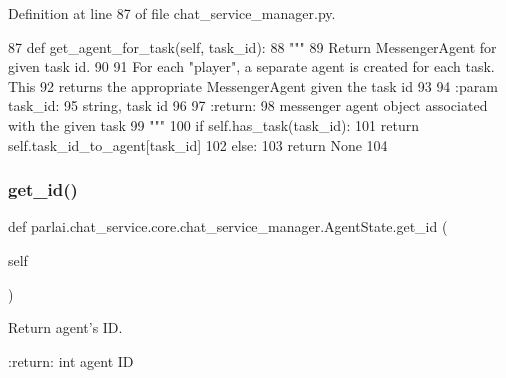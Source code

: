Definition at line 87 of file chat\+\_\+service\+\_\+manager.\+py.


\begin{DoxyCode}
87     \textcolor{keyword}{def }get\_agent\_for\_task(self, task\_id):
88         \textcolor{stringliteral}{"""}
89 \textcolor{stringliteral}{        Return MessengerAgent for given task id.}
90 \textcolor{stringliteral}{}
91 \textcolor{stringliteral}{        For each "player", a separate agent is created for each task. This}
92 \textcolor{stringliteral}{        returns the appropriate MessengerAgent given the task id}
93 \textcolor{stringliteral}{}
94 \textcolor{stringliteral}{        :param task\_id:}
95 \textcolor{stringliteral}{            string, task id}
96 \textcolor{stringliteral}{}
97 \textcolor{stringliteral}{        :return:}
98 \textcolor{stringliteral}{            messenger agent object associated with the given task}
99 \textcolor{stringliteral}{        """}
100         \textcolor{keywordflow}{if} self.has\_task(task\_id):
101             \textcolor{keywordflow}{return} self.task\_id\_to\_agent[task\_id]
102         \textcolor{keywordflow}{else}:
103             \textcolor{keywordflow}{return} \textcolor{keywordtype}{None}
104 
\end{DoxyCode}
\mbox{\label{classparlai_1_1chat__service_1_1core_1_1chat__service__manager_1_1AgentState_adaab949a7dfa5f97a50fb2f32efd4549}} 
\subsubsection{\texorpdfstring{get\+\_\+id()}{get\_id()}}
{\footnotesize\ttfamily def parlai.\+chat\+\_\+service.\+core.\+chat\+\_\+service\+\_\+manager.\+Agent\+State.\+get\+\_\+id (\begin{DoxyParamCaption}\item[{}]{self }\end{DoxyParamCaption})}

\begin{DoxyVerb}Return agent's ID.

:return:
    int agent ID
\end{DoxyVerb}
 

